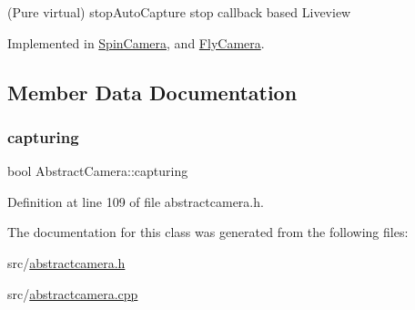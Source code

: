 (Pure virtual) stop\+Auto\+Capture stop callback based Liveview 



Implemented in \mbox{\hyperlink{class_spin_camera_a161f8d383c56161a8e7731d7299504db}{Spin\+Camera}}, and \mbox{\hyperlink{class_fly_camera_a7d637bd9237fae3ee3cd55b044ec80f1}{Fly\+Camera}}.



\subsection{Member Data Documentation}
\mbox{\label{class_abstract_camera_a8fa772437cbf23ba88f38c6e5b9f64d8}} 
\subsubsection{\texorpdfstring{capturing}{capturing}}
{\footnotesize\ttfamily bool Abstract\+Camera\+::capturing\hspace{0.3cm}{\ttfamily [protected]}}



Definition at line 109 of file abstractcamera.\+h.



The documentation for this class was generated from the following files\+:\begin{DoxyCompactItemize}
\item 
src/\mbox{\hyperlink{abstractcamera_8h}{abstractcamera.\+h}}\item 
src/\mbox{\hyperlink{abstractcamera_8cpp}{abstractcamera.\+cpp}}\end{DoxyCompactItemize}

